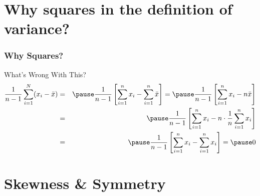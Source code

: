 \section{Why squares in the definition of variance?}
\begin{frame}
\frametitle{Why Squares?}
\begin{center}\end{center}
\begin{alertblock}{What's Wrong With This?}
	\begin{eqnarray*}
		\displaystyle\frac{1}{n-1}\sum_{i=1}^N (x_i - \bar{x}) &=& \pause\frac{1}{n-1}\left[\sum_{i=1}^n x_i - \sum_{i=1}^n \bar{x} \right] = \pause\frac{1}{n-1}\left[ \sum_{i=1}^n x_i  - n\bar{x}\right]\\
			&=& \pause \frac{1}{n-1}\left[ \sum_{i=1}^n x_i  - n\cdot\frac{1}{n} \sum_{i=1}^n x_i\right]\\ &=& \pause \frac{1}{n-1}\left[ \sum_{i=1}^n x_i  -  \sum_{i=1}^n x_i\right] =\pause 0
	\end{eqnarray*}
\end{alertblock}

\end{frame}
\section{Skewness \& Symmetry}

%
%
%
%
%

